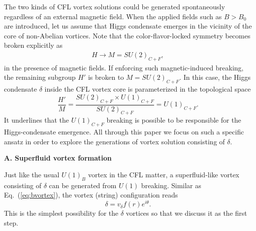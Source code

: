 \documentclass[12pt]{article}
\begin{document}
The two kinds of CFL vortex solutions could be 
generated spontaneously regardless of an external magnetic field.
When the applied fields such as $B > B_0$ are introduced, let us assume that Higgs condensate emerges in the vicinity of the core of non-Abelian vortices. Note that the color-flavor-locked symmetry becomes broken explicitly as \cite{ferrer2007magnetic}
\begin{eqnarray}
H\rightarrow M=SU(2)_{C+F},
\label{cfl2}\end{eqnarray}
in the presence of magnetic fields.
If enforcing such magnetic-induced breaking, the remaining subgroup $H'$ is broken to $M =SU(2)_{C+F}$. In this case, the Higgs condensate $\delta$ inside the CFL vortex core is parameterized in the topological space
\begin{equation}
  \label{eq:mcfsymm}
 \frac{H'}{M} = \frac{SU(2)_{C+F} \times U(1)_{C+F}}{SU(2)_{C+F}} = U(1)_{C+F}.
\end{equation}
It underlines that the $U(1)_{C+F}$ breaking is possible to be responsible for the Higgs-condensate emergence.
All through this paper we focus on such a specific ansatz in order to explore the generations of vortex solution consisting of $\delta$.

\vspace{0.2cm}
\textbf{A. Superfluid vortex formation }
\vspace{0.2cm}

Just like the usual $U(1)_B$ vortex in the CFL matter, a superfluid-like vortex consisting of $\delta$ can be generated from $U(1)$ breaking. Similar as Eq.~(\ref{eq:bvortex}), the vortex (string) configuration reads
\begin{equation}
	\delta= v_\delta f(r) e^{i\theta}.\label{mcflvortex}
\end{equation}
This is the simplest possibility for the $\delta$ vortices so that we discuss it 
as the first step.
\end{document}
